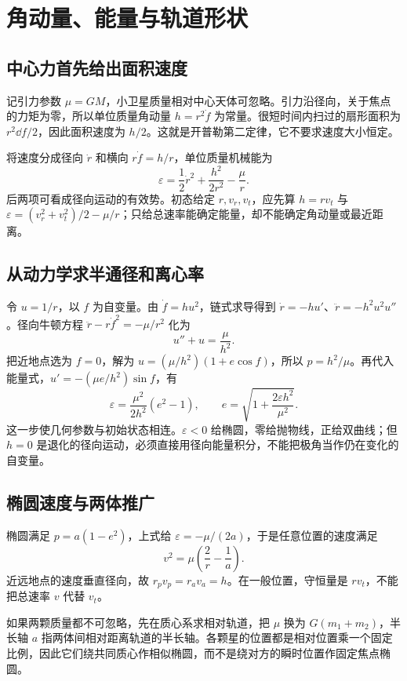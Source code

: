   \section{角动量、能量与轨道形状}
\subsection{中心力首先给出面积速度}

记引力参数 $\mu=GM$，小卫星质量相对中心天体可忽略。引力沿径向，关于焦点的力矩为零，所以单位质量角动量 $h=r^2\dot f$ 为常量。很短时间内扫过的扇形面积为 $r^2\dd f/2$，因此面积速度为 $h/2$。这就是开普勒第二定律，它不要求速度大小恒定。

将速度分成径向 $\dot r$ 和横向 $r\dot f=h/r$，单位质量机械能为
\[\varepsilon=\frac12\dot r^2+\frac{h^2}{2r^2}-\frac\mu r.
\]
后两项可看成径向运动的有效势。初态给定 $r,v_r,v_t$，应先算 $h=rv_t$ 与 $\varepsilon=(v_r^2+v_t^2)/2-\mu/r$；只给总速率能确定能量，却不能确定角动量或最近距离。

\subsection{从动力学求半通径和离心率}

令 $u=1/r$，以 $f$ 为自变量。由 $\dot f=hu^2$，链式求导得到 $\dot r=-hu'$、$\ddot r=-h^2u^2u''$。径向牛顿方程 $\ddot r-r\dot f^2=-\mu/r^2$ 化为
\[u''+u=\frac\mu{h^2}.\]
把近地点选为 $f=0$，解为 $u=(\mu/h^2)(1+e\cos f)$，所以 $p=h^2/\mu$。再代入能量式，$u'=-(\mu e/h^2)\sin f$，有
\[\varepsilon=\frac{\mu^2}{2h^2}(e^2-1),\qquad
 e=\sqrt{1+\frac{2\varepsilon h^2}{\mu^2}}.
\]
这一步使几何参数与初始状态相连。$\varepsilon<0$ 给椭圆，零给抛物线，正给双曲线；但 $h=0$ 是退化的径向运动，必须直接用径向能量积分，不能把极角当作仍在变化的自变量。

\subsection{椭圆速度与两体推广}

椭圆满足 $p=a(1-e^2)$，上式给 $\varepsilon=-\mu/(2a)$，于是任意位置的速度满足
\[v^2=\mu\left(\frac2r-\frac1a\right).\]
近远地点的速度垂直径向，故 $r_pv_p=r_av_a=h$。在一般位置，守恒量是 $rv_t$，不能把总速率 $v$ 代替 $v_t$。

如果两颗质量都不可忽略，先在质心系求相对轨道，把 $\mu$ 换为 $G(m_1+m_2)$，半长轴 $a$ 指两体间相对距离轨道的半长轴。各颗星的位置都是相对位置乘一个固定比例，因此它们绕共同质心作相似椭圆，而不是绕对方的瞬时位置作固定焦点椭圆。


